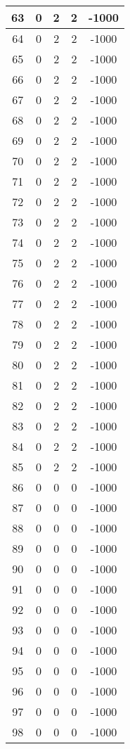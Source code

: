 \documentclass[letterpaper, 12pt]{article}
\begin{document}
\begin{longtable}{|c|c|c|c|c|}
\hline
63 & 0 & 2 & 2 & -1000 \\
\hline
64 & 0 & 2 & 2 & -1000 \\
\hline
65 & 0 & 2 & 2 & -1000 \\
\hline
66 & 0 & 2 & 2 & -1000 \\
\hline
67 & 0 & 2 & 2 & -1000 \\
\hline
68 & 0 & 2 & 2 & -1000 \\
\hline
69 & 0 & 2 & 2 & -1000 \\
\hline
70 & 0 & 2 & 2 & -1000 \\
\hline
71 & 0 & 2 & 2 & -1000 \\
\hline
72 & 0 & 2 & 2 & -1000 \\
\hline
73 & 0 & 2 & 2 & -1000 \\
\hline
74 & 0 & 2 & 2 & -1000 \\
\hline
75 & 0 & 2 & 2 & -1000 \\
\hline
76 & 0 & 2 & 2 & -1000 \\
\hline
77 & 0 & 2 & 2 & -1000 \\
\hline
78 & 0 & 2 & 2 & -1000 \\
\hline
79 & 0 & 2 & 2 & -1000 \\
\hline
80 & 0 & 2 & 2 & -1000 \\
\hline
81 & 0 & 2 & 2 & -1000 \\
\hline
82 & 0 & 2 & 2 & -1000 \\
\hline
83 & 0 & 2 & 2 & -1000 \\
\hline
84 & 0 & 2 & 2 & -1000 \\
\hline
85 & 0 & 2 & 2 & -1000 \\
\hline
86 & 0 & 0 & 0 & -1000 \\
\hline
87 & 0 & 0 & 0 & -1000 \\
\hline
88 & 0 & 0 & 0 & -1000 \\
\hline
89 & 0 & 0 & 0 & -1000 \\
\hline
90 & 0 & 0 & 0 & -1000 \\
\hline
91 & 0 & 0 & 0 & -1000 \\
\hline
92 & 0 & 0 & 0 & -1000 \\
\hline
93 & 0 & 0 & 0 & -1000 \\
\hline
94 & 0 & 0 & 0 & -1000 \\
\hline
95 & 0 & 0 & 0 & -1000 \\
\hline
96 & 0 & 0 & 0 & -1000 \\
\hline
97 & 0 & 0 & 0 & -1000 \\
\hline
98 & 0 & 0 & 0 & -1000 \\

\end{longtable}
\end{document}
